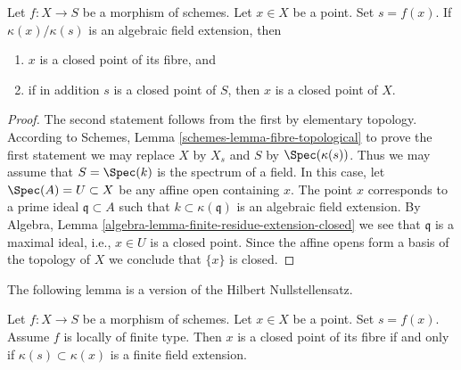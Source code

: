 \begin{lemma}
\label{lemma-algebraic-residue-field-extension-closed-point-fibre}
Let $f : X \to S$ be a morphism of schemes.
Let $x \in X$ be a point. Set $s = f(x)$.
If $\kappa(x)/\kappa(s)$
is an algebraic field extension, then
\begin{enumerate}
\item $x$ is a closed point of its fibre, and
\item if in addition $s$ is a closed point of $S$, then
$x$ is a closed point of $X$.
\end{enumerate}
\end{lemma}

\begin{proof}
The second statement follows from the first by elementary topology.
According to Schemes, Lemma \ref{schemes-lemma-fibre-topological}
to prove the first statement
we may replace $X$ by $X_s$ and $S$ by $\Spec(\kappa(s))$.
Thus we may assume that $S = \Spec(k)$ is the spectrum of a field.
In this case, let $\Spec(A) = U \subset X$ be any affine open
containing $x$. The point $x$ corresponds to a prime ideal
$\mathfrak q \subset A$ such that $k \subset \kappa(\mathfrak q)$
is an algebraic field extension. By
Algebra, Lemma \ref{algebra-lemma-finite-residue-extension-closed}
we see that $\mathfrak q$ is a maximal ideal, i.e., $x \in U$ is a
closed point. Since the affine opens form
a basis of the topology of $X$ we conclude that $\{x\}$ is closed.
\end{proof}

\noindent
The following lemma is a version of the Hilbert Nullstellensatz.

\begin{lemma}
\label{lemma-closed-point-fibre-locally-finite-type}
Let $f : X \to S$ be a morphism of schemes.
Let $x \in X$ be a point. Set $s = f(x)$.
Assume $f$ is locally of finite type.
Then $x$ is a closed point of its fibre
if and only if $\kappa(s) \subset \kappa(x)$ is
a finite field extension.
\end{lemma}

